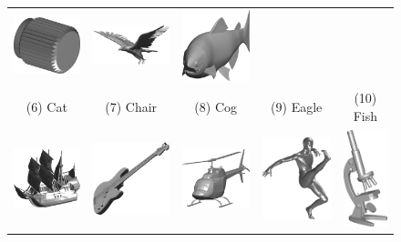 \begin{figure}[ht!]
\begin{tabular}{ccccc}
	\includegraphics[width=0.15\linewidth]{./fig/eval/08cog.png} \hspace{0mm} &
	\includegraphics[width=0.15\linewidth]{./fig/eval/09eagle.png} \hspace{0mm} &
	\includegraphics[width=0.15\linewidth]{./fig/eval/10fish.png} \hspace{0mm} \\ 
	(6) Cat & (7) Chair & (8) Cog & (9) Eagle & (10) Fish \\
	\includegraphics[width=0.15\linewidth]{./fig/eval/11galleon.png} \hspace{0mm} & 
	\includegraphics[width=0.15\linewidth]{./fig/eval/12guitar.png} \hspace{0mm} &
	\includegraphics[width=0.15\linewidth]{./fig/eval/13helicopter.png} \hspace{0mm} &
	\includegraphics[width=0.12\linewidth]{./fig/eval/14man.png} \hspace{0mm} & 
	\includegraphics[width=0.07\linewidth]{./fig/eval/15microscope.png} \hspace{0mm} \\

\end{tabular}
\end{figure}
